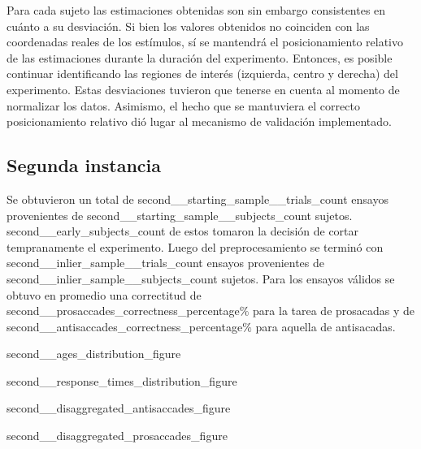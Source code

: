 Para cada sujeto las estimaciones obtenidas son sin embargo consistentes en
cuánto a su desviación. Si bien los valores obtenidos no coinciden con las
coordenadas reales de los estímulos, sí se mantendrá el posicionamiento
relativo de las estimaciones durante la duración del experimento. Entonces, es
posible continuar identificando las regiones de interés (izquierda, centro y
derecha) del experimento. Estas desviaciones tuvieron que tenerse en cuenta al
momento de normalizar los datos. Asimismo, el hecho que se mantuviera el
correcto posicionamiento relativo dió lugar al mecanismo de validación
implementado.


\subsection{{Segunda instancia}}

Se obtuvieron un total de {second__starting_sample__trials_count} ensayos
provenientes de {second__starting_sample__subjects_count} sujetos.
{second__early_subjects_count} de estos tomaron la decisión de cortar
tempranamente el experimento.
Luego del preprocesamiento se terminó con {second__inlier_sample__trials_count}
ensayos provenientes de {second__inlier_sample__subjects_count} sujetos.
Para los ensayos válidos se obtuvo en promedio una correctitud de 
{second__prosaccades_correctness_percentage}$\%$ para la tarea de prosacadas y
de {second__antisaccades_correctness_percentage}$\%$ para aquella de
antisacadas.
 

{second__ages_distribution_figure}

{second__response_times_distribution_figure}

{second__disaggregated_antisaccades_figure}

{second__disaggregated_prosaccades_figure}
